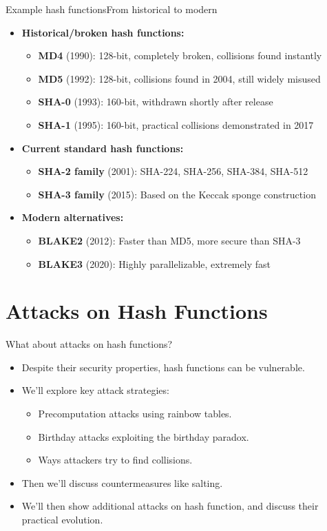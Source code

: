 \documentclass[aspectratio=169, lualatex, handout]{beamer}
\begin{document}
\begin{frame}{Example hash functions}{From historical to modern}
	\begin{itemize}[<+->]
		\item \textbf{Historical/broken hash functions:}
		      \begin{itemize}
			      \item \textbf{MD4} (1990): 128-bit, completely broken, collisions found instantly
			      \item \textbf{MD5} (1992): 128-bit, collisions found in 2004, still widely misused
			      \item \textbf{SHA-0} (1993): 160-bit, withdrawn shortly after release
			      \item \textbf{SHA-1} (1995): 160-bit, practical collisions demonstrated in 2017
		      \end{itemize}
		\item \textbf{Current standard hash functions:}
		      \begin{itemize}
			      \item \textbf{SHA-2 family} (2001): SHA-224, SHA-256, SHA-384, SHA-512
			      \item \textbf{SHA-3 family} (2015): Based on the Keccak sponge construction
		      \end{itemize}
		\item \textbf{Modern alternatives:}
		      \begin{itemize}
			      \item \textbf{BLAKE2} (2012): Faster than MD5, more secure than SHA-3
			      \item \textbf{BLAKE3} (2020): Highly parallelizable, extremely fast
		      \end{itemize}
	\end{itemize}
\end{frame}

\section{Attacks on Hash Functions}

\begin{frame}{What about attacks on hash functions?}
	\begin{itemize}[<+->]
		\item Despite their security properties, hash functions can be vulnerable.
		\item We'll explore key attack strategies:
		      \begin{itemize}
			      \item Precomputation attacks using rainbow tables.
			      \item Birthday attacks exploiting the birthday paradox.
			      \item Ways attackers try to find collisions.
		      \end{itemize}
		\item Then we'll discuss countermeasures like salting.
		\item We'll then show additional attacks on hash function, and discuss their practical evolution.
	\end{itemize}
\end{frame}
\end{document}
